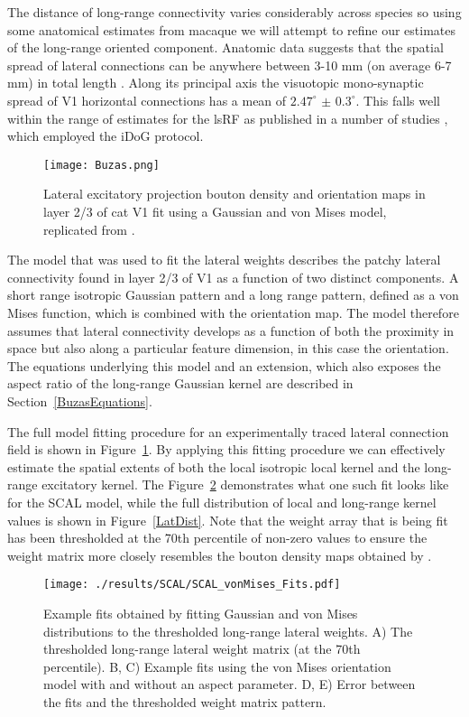 The distance of long-range connectivity varies considerably across
species so using some anatomical estimates from macaque we will
attempt to refine our estimates of the long-range oriented
component. Anatomic data suggests that the spatial spread of lateral
connections can be anywhere between 3-10 mm (on average 6-7 mm) in
total length \citep{Angelucci2002}. Along its principal axis the
visuotopic mono-synaptic spread of V1 horizontal connections has a
mean of \(2.47^\circ\) \(\pm\) \(0.3^\circ\). This falls well within
the range of estimates for the lsRF as published in a number of
studies \citep{Sceniak1999, Sceniak2001, Shushruth2009}, which employed
the iDoG protocol.

\begin{figure}
	\centering
        \texttt{[image: Buzas.png]}
	\caption{Lateral excitatory projection bouton density and
          orientation maps in layer 2/3 of cat V1 fit using a Gaussian
          and von Mises model, replicated from \cite{Buzas2006}.}
	\label{Buzas}
\end{figure}

The model that was used to fit the lateral weights describes the
patchy lateral connectivity found in layer 2/3 of V1 as a function of
two distinct components. A short range isotropic Gaussian pattern and
a long range pattern, defined as a von Mises function, which is
combined with the orientation map. The model therefore assumes that
lateral connectivity develops as a function of both the proximity in
space but also along a particular feature dimension, in this case the
orientation. The equations underlying this model and an extension,
which also exposes the aspect ratio of the long-range Gaussian kernel
are described in Section~\ref{BuzasEquations}.

The full model fitting procedure for an experimentally traced lateral
connection field is shown in Figure~\ref{Buzas}. By applying this
fitting procedure we can effectively estimate the spatial extents of
both the local isotropic local kernel and the long-range excitatory
kernel. The Figure~\ref{LatFits} demonstrates what one such fit looks
like for the SCAL model, while the full distribution of local and
long-range kernel values is shown in Figure~\ref{LatDist}. Note that
the weight array that is being fit has been thresholded at the 70th
percentile of non-zero values to ensure the weight matrix more closely
resembles the bouton density maps obtained by \cite{Buzas2006}.

\begin{figure}
	\centering
        \texttt{[image: ./results/SCAL/SCAL\_vonMises\_Fits.pdf]}
	\caption[Combined Gaussian+vonMises model fits to lateral
      connectivity of the SCAL model.]{Example fits obtained by
      fitting Gaussian and von Mises distributions to the thresholded
      long-range lateral weights. A) The thresholded long-range
      lateral weight matrix (at the 70th percentile). B, C) Example
      fits using the von Mises orientation model with and without an
      aspect parameter. D, E) Error between the fits and the
      thresholded weight matrix pattern.}
	\label{LatFits}
\end{figure}

